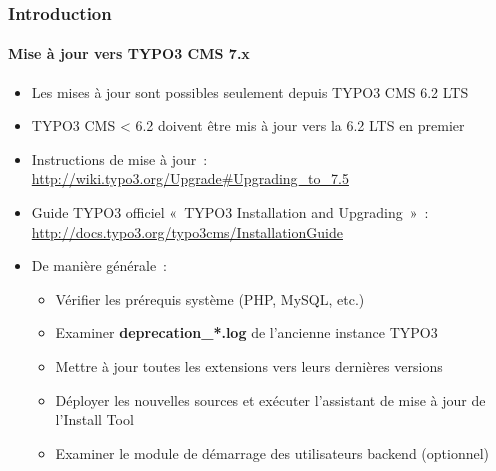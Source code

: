 \begin{frame}[fragile]
	\frametitle{Introduction}
	\framesubtitle{Mise à jour vers TYPO3 CMS 7.x}

	\begin{itemize}
		\item Les mises à jour sont possibles seulement depuis TYPO3 CMS 6.2 LTS
		\item TYPO3 CMS < 6.2 doivent être mis à jour vers la 6.2 LTS en premier
	\end{itemize}

	\begin{itemize}

		\item Instructions de mise à jour~:\newline
			\smaller\url{http://wiki.typo3.org/Upgrade#Upgrading_to_7.5}\normalsize
		\item Guide TYPO3 officiel «~TYPO3 Installation and Upgrading~»~:
			\smaller\url{http://docs.typo3.org/typo3cms/InstallationGuide}\normalsize
		\item De manière générale~:
			\begin{itemize}
				\item Vérifier les prérequis système \small(PHP, MySQL, etc.)
				\item Examiner \textbf{deprecation\_*.log} de l'ancienne instance TYPO3
				\item Mettre à jour toutes les extensions vers leurs dernières versions
				\item Déployer les nouvelles sources et exécuter l'assistant de mise à jour de l'Install Tool
				\item Examiner le module de démarrage des utilisateurs backend (optionnel)
			\end{itemize}
	\end{itemize}

\end{frame}

